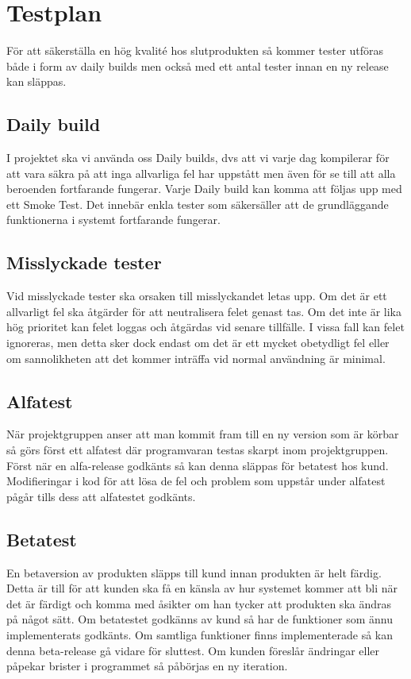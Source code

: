 \section{Testplan}
För att säkerställa en hög kvalité hos slutprodukten så kommer tester utföras både i form av daily builds men också med ett antal tester innan en ny release kan släppas.

\subsection{Daily build}
I projektet ska vi använda oss Daily builds, dvs att vi varje dag kompilerar för att vara säkra på att inga allvarliga fel har uppstått men även för se till att alla beroenden fortfarande fungerar. Varje Daily build kan komma att följas upp med ett Smoke Test. Det innebär enkla tester som säkersäller att de grundläggande funktionerna i systemt fortfarande fungerar. 

\subsection{Misslyckade tester}
Vid misslyckade tester ska orsaken till misslyckandet letas upp. Om det är ett allvarligt fel ska åtgärder för att neutralisera felet genast tas. Om det inte är lika hög prioritet kan felet loggas och åtgärdas vid senare tillfälle. I vissa fall kan felet ignoreras, men detta sker dock endast om det är ett mycket obetydligt fel eller om sannolikheten att det kommer inträffa vid normal användning är minimal.

\subsection{Alfatest}
När projektgruppen anser att man kommit fram till en ny version som är körbar så görs först ett alfatest där programvaran testas skarpt inom projektgruppen. Först när en alfa-release godkänts så kan denna släppas för betatest hos kund. Modifieringar i kod för att lösa de fel och problem som uppstår under alfatest pågår tills dess att alfatestet godkänts.

\subsection{Betatest}
En betaversion av produkten släpps till kund innan produkten är helt färdig. Detta är till för att kunden ska få en känsla av hur systemet kommer att bli när det är färdigt och komma med åsikter om han tycker att produkten ska ändras på något sätt. Om betatestet godkänns av kund så har de funktioner som ännu implementerats godkänts. Om samtliga funktioner finns implementerade så kan denna beta-release gå vidare för sluttest. Om kunden föreslår ändringar eller påpekar brister i programmet så påbörjas en ny iteration.

